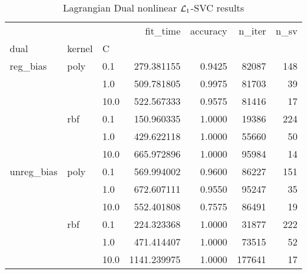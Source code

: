 \begin{table}[H]
\centering
\caption{Lagrangian Dual nonlinear $\protect \mathcal{L}_1$-SVC results}
\label{nonlinear_lagrangian_dual_l1_svc_cv_results}
\begin{tabular}{lllrrrr}
\toprule
           &     &      &     fit\_time &  accuracy &  n\_iter &  n\_sv \\
dual & kernel & C &              &           &         &       \\
\midrule
reg\_bias & poly & 0.1  &   279.381155 &    0.9425 &   82087 &   148 \\
           &     & 1.0  &   509.781805 &    0.9975 &   81703 &    39 \\
           &     & 10.0 &   522.567333 &    0.9575 &   81416 &    17 \\
           & rbf & 0.1  &   150.960335 &    1.0000 &   19386 &   224 \\
           &     & 1.0  &   429.622118 &    1.0000 &   55660 &    50 \\
           &     & 10.0 &   665.972896 &    1.0000 &   95984 &    14 \\
unreg\_bias & poly & 0.1  &   569.994002 &    0.9600 &   86227 &   151 \\
           &     & 1.0  &   672.607111 &    0.9550 &   95247 &    35 \\
           &     & 10.0 &   552.401808 &    0.7575 &   86491 &    19 \\
           & rbf & 0.1  &   224.323368 &    1.0000 &   31877 &   222 \\
           &     & 1.0  &   471.414407 &    1.0000 &   73515 &    52 \\
           &     & 10.0 &  1141.239975 &    1.0000 &  177641 &    17 \\
\bottomrule
\end{tabular}
\end{table}

